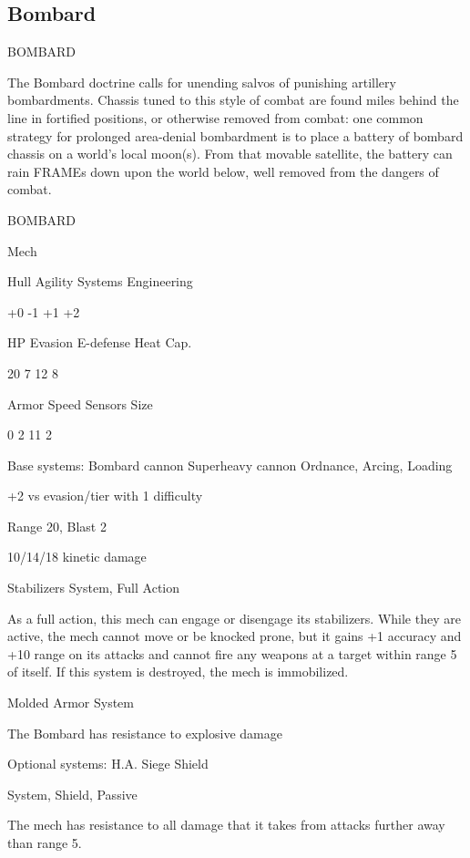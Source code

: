 \subsection{Bombard}

                                             BOMBARD

The Bombard doctrine calls for unending salvos of punishing artillery bombardments. Chassis
tuned to this style of combat are found miles behind the line in fortified positions, or otherwise
removed from combat: one common strategy for prolonged area-denial bombardment is to place
a battery of bombard chassis on a world’s local moon(s). From that movable satellite, the battery
can rain FRAMEs down upon the world below, well removed from the dangers of combat.


       BOMBARD

       Mech

       Hull      Agility     Systems       Engineering

       +0        -1          +1            +2

       HP        Evasion     E-defense     Heat Cap.

       20        7            12           8

      Armor      Speed       Sensors       Size

       0         2            11           2

Base systems:
Bombard cannon
Superheavy cannon
Ordnance, Arcing, Loading

+2 vs evasion/tier with 1 difficulty

Range 20, Blast 2

10/14/18 kinetic damage


Stabilizers
System, Full Action

As a full action, this mech can engage or disengage its stabilizers. While they are active, the
mech cannot move or be knocked prone, but it gains +1 accuracy and +10 range on its attacks
and cannot fire any weapons at a target within range 5 of itself. If this system is destroyed, the
mech is immobilized.


Molded Armor
System

The Bombard has resistance to explosive damage


Optional systems:
H.A. Siege Shield




System, Shield, Passive

The mech has resistance to all damage that it takes from attacks further away than range 5.


